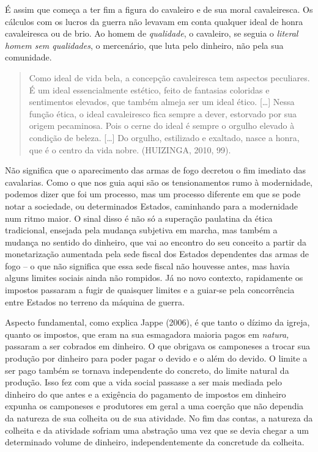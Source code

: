 É assim que começa a ter fim a figura do cavaleiro e de sua moral
cavaleiresca. Os cálculos com os lucros da guerra não levavam em conta
qualquer ideal de honra cavaleiresca ou de brio. Ao homem de
\emph{qualidade}, o cavaleiro, se seguia o \emph{literal homem sem
qualidades}, o mercenário, que luta pelo dinheiro, não pela sua
comunidade.

\begin{quote}
Como ideal de vida bela, a concepção cavaleiresca tem aspectos
peculiares. É um ideal essencialmente estético, feito de fantasias
coloridas e sentimentos elevados, que também almeja ser um ideal ético.
{[}\ldots{}{]} Nessa função ética, o ideal cavaleiresco fica sempre a
dever, estorvado por sua origem pecaminosa. Pois o cerne do ideal é
sempre o orgulho elevado à condição de beleza. {[}\ldots{}{]} Do
orgulho, estilizado e exaltado, nasce a honra, que é o centro da vida
nobre. (HUIZINGA, 2010, 99).
\end{quote}

Não significa que o aparecimento das armas de fogo decretou o fim
imediato das cavalarias. Como o que nos guia aqui são os tensionamentos
rumo à modernidade, podemos dizer que foi um processo, mas um processo
diferente em que se pode notar a sociedade, ou determinados Estados,
caminhando para a modernidade num ritmo maior. O sinal disso é não só a
superação paulatina da ética tradicional, ensejada pela mudança
subjetiva em marcha, mas também a mudança no sentido do dinheiro, que
vai ao encontro do seu conceito a partir da monetarização aumentada pela
sede fiscal dos Estados dependentes das armas de fogo -- o que não
significa que essa sede fiscal não houvesse antes, mas havia alguns
limites sociais ainda não rompidos. Já no novo contexto, rapidamente os
impostos passaram a fugir de quaisquer limites e a guiar-se pela
concorrência entre Estados no terreno da máquina de guerra.

Aspecto fundamental, como explica Jappe (2006), é que tanto o dízimo da
igreja, quanto os impostos, que eram na sua esmagadora maioria pagos em
\emph{natura,} passaram a ser cobrados em dinheiro. O que obrigava os
camponeses a trocar sua produção por dinheiro para poder pagar o devido
e o além do devido. O limite a ser pago também se tornava independente
do concreto, do limite natural da produção. Isso fez com que a vida
social passasse a ser mais mediada pelo dinheiro do que antes e a
exigência do pagamento de impostos em dinheiro expunha os camponeses e
produtores em geral a uma coerção que não dependia da natureza de sua
colheita ou de sua atividade. No fim das contas, a natureza da colheita
e da atividade sofriam uma abstração uma vez que se devia chegar a um
determinado volume de dinheiro, independentemente da concretude da
colheita.

